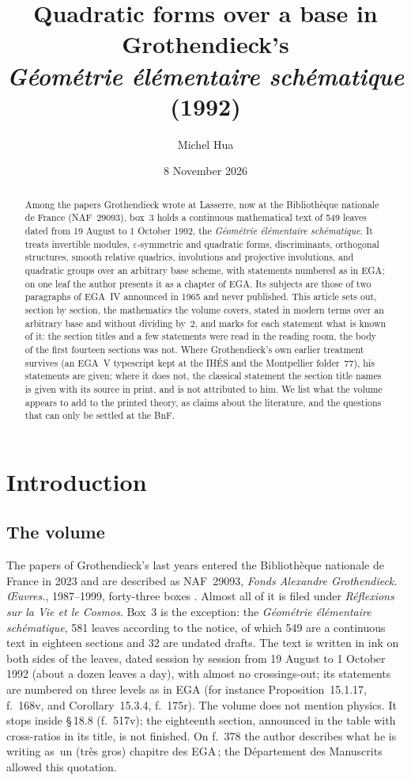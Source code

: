 \documentclass[11pt,a4paper]{amsart}
\title[Quadratic forms over a base in Grothendieck's 1992 volume]{Quadratic forms over a base in Grothendieck's\\ \emph{Géométrie élémentaire schématique} (1992)}
\author{Michel Hua}
\date{8 November 2026}
\newcommand{\q}[1]{\guillemotleft\,#1\,\guillemotright}
\theoremstyle{plain}
\theoremstyle{definition}
\begin{document}
\begin{abstract}
Among the papers Grothendieck wrote at Lasserre, now at the Bibliothèque nationale de France (NAF~29093), box~3 holds a continuous mathematical text of 549 leaves dated from 19 August to 1 October 1992, the \emph{Géométrie élémentaire schématique}. It treats invertible modules, $\varepsilon$-symmetric and quadratic forms, discriminants, orthogonal structures, smooth relative quadrics, involutions and projective involutions, and quadratic groups over an arbitrary base scheme, with statements numbered as in EGA; on one leaf the author presents it as a chapter of EGA. Its subjects are those of two paragraphs of EGA~IV announced in 1965 and never published. This article sets out, section by section, the mathematics the volume covers, stated in modern terms over an arbitrary base and without dividing by~$2$, and marks for each statement what is known of it: the section titles and a few statements were read in the reading room, the body of the first fourteen sections was not. Where Grothendieck's own earlier treatment survives (an EGA~V typescript kept at the IHÉS and the Montpellier folder~77), his statements are given; where it does not, the classical statement the section title names is given with its source in print, and is not attributed to him. We list what the volume appears to add to the printed theory, as claims about the literature, and the questions that can only be settled at the BnF.
\end{abstract}
\maketitle

\section{Introduction}

\subsection{The volume}
The papers of Grothendieck's last years entered the Bibliothèque nationale de France in 2023 and are described as NAF~29093, \emph{Fonds Alexandre Grothendieck. \OE uvres.}, 1987--1999, forty-three boxes \cite{bnf-notice}. Almost all of it is filed under \emph{Réflexions sur la Vie et le Cosmos}. Box~3 is the exception: the \emph{Géométrie élémentaire schématique}, 581 leaves according to the notice, of which 549 are a continuous text in eighteen sections and 32 are undated drafts. The text is written in ink on both sides of the leaves, dated session by session from 19 August to 1 October 1992 (about a dozen leaves a day), with almost no crossings-out; its statements are numbered on three levels as in EGA (for instance Proposition~15.1.17, f.~168v, and Corollary~15.3.4, f.~175r). The volume does not mention physics. It stops inside \S\,18.8 (f.~517v); the eighteenth section, announced in the table with cross-ratios in its title, is not finished. On f.~378 the author describes what he is writing as \q{un (très gros) chapitre des EGA}; the Département des Manuscrits allowed this quotation.
\end{document}
